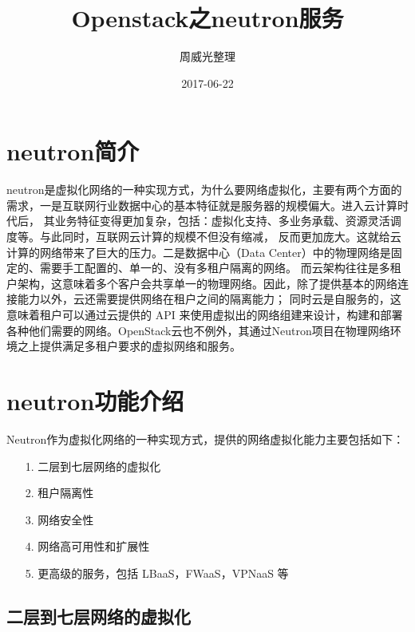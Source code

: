 \documentclass[a4paper,left=1.5cm,right=1.5cm,11pt]{article}
\title{Openstack之neutron服务}
\author{周威光整理}
\date{2017-06-22}
\begin{document}
\tableofcontents

\clearpage

\maketitle
\section{neutron简介}
neutron是虚拟化网络的一种实现方式，为什么要网络虚拟化，主要有两个方面的需求，一是互联网行业数据中心的基本特征就是服务器的规模偏大。进入云计算时代后，
其业务特征变得更加复杂，包括：虚拟化支持、多业务承载、资源灵活调度等。与此同时，互联网云计算的规模不但没有缩减，
反而更加庞大。这就给云计算的网络带来了巨大的压力。二是数据中心（Data Center）中的物理网络是固定的、需要手工配置的、单一的、没有多租户隔离的网络。
而云架构往往是多租户架构，这意味着多个客户会共享单一的物理网络。因此，除了提供基本的网络连接能力以外，云还需要提供网络在租户之间的隔离能力；
同时云是自服务的，这意味着租户可以通过云提供的 API 来使用虚拟出的网络组建来设计，构建和部署各种他们需要的网络。OpenStack云也不例外，其通过Neutron项目在物理网络环境之上提供满足多租户要求的虚拟网络和服务。
\section{neutron功能介绍}
Neutron作为虚拟化网络的一种实现方式，提供的网络虚拟化能力主要包括如下：
\begin{itemize}
	\item[1.]二层到七层网络的虚拟化
	\item[2.]租户隔离性
	\item[3.]网络安全性
	\item[4.]网络高可用性和扩展性
	\item[5.]更高级的服务，包括 LBaaS，FWaaS，VPNaaS 等
\end{itemize}
\subsection{二层到七层网络的虚拟化}
\end{document}
